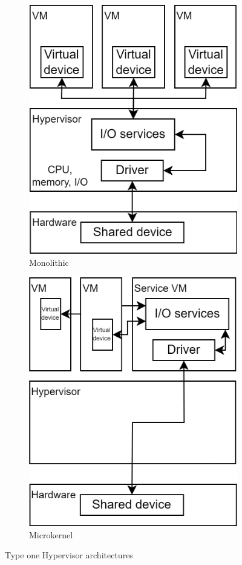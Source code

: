 \begin{itemize}
        \begin{figure}[H]
            \centering
            \begin{subfigure}{0.4\textwidth}
                \centering
                \includegraphics[width=0.75\linewidth]{images/mono.png} 
                \caption{Monolithic}
            \end{subfigure}
            \begin{subfigure}{0.4\textwidth}
                \centering
                \includegraphics[width=0.75\linewidth]{images/mic.png}
                \caption{Microkernel}
            \end{subfigure}
            \caption{Type one Hypervisor architectures}
        \end{figure}


\end{itemize}
